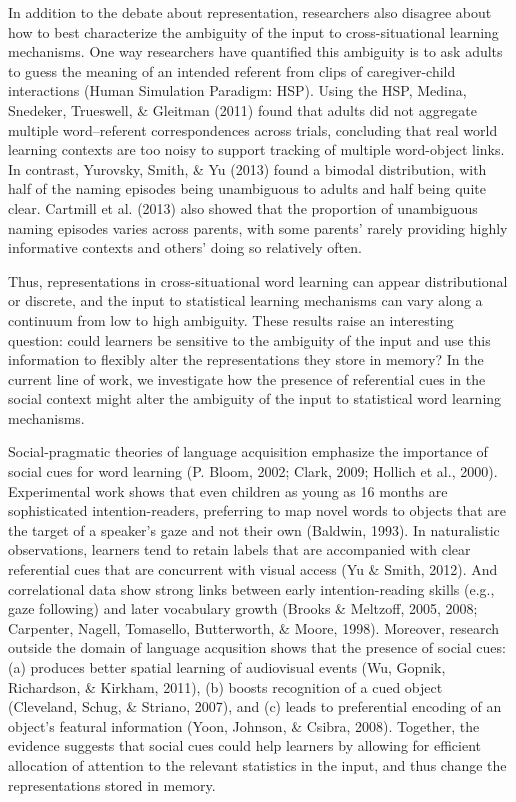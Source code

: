 \documentclass[authoryear, review]{elsarticle}
\begin{document}
In addition to the debate about representation, researchers also
disagree about how to best characterize the ambiguity of the input to
cross-situational learning mechanisms. One way researchers have
quantified this ambiguity is to ask adults to guess the meaning of an
intended referent from clips of caregiver-child interactions (Human
Simulation Paradigm: HSP). Using the HSP, Medina, Snedeker, Trueswell,
\& Gleitman (2011) found that adults did not aggregate multiple
word--referent correspondences across trials, concluding that real world
learning contexts are too noisy to support tracking of multiple
word-object links. In contrast, Yurovsky, Smith, \& Yu (2013) found a
bimodal distribution, with half of the naming episodes being unambiguous
to adults and half being quite clear. Cartmill et al. (2013) also showed
that the proportion of unambiguous naming episodes varies across
parents, with some parents' rarely providing highly informative contexts
and others' doing so relatively often.

Thus, representations in cross-situational word learning can appear
distributional or discrete, and the input to statistical learning
mechanisms can vary along a continuum from low to high ambiguity. These
results raise an interesting question: could learners be sensitive to
the ambiguity of the input and use this information to flexibly alter
the representations they store in memory? In the current line of work,
we investigate how the presence of referential cues in the social
context might alter the ambiguity of the input to statistical word
learning mechanisms.

Social-pragmatic theories of language acquisition emphasize the
importance of social cues for word learning (P. Bloom, 2002; Clark,
2009; Hollich et al., 2000). Experimental work shows that even children
as young as 16 months are sophisticated intention-readers, preferring to
map novel words to objects that are the target of a speaker's gaze and
not their own (Baldwin, 1993). In naturalistic observations, learners
tend to retain labels that are accompanied with clear referential cues
that are concurrent with visual access (Yu \& Smith, 2012). And
correlational data show strong links between early intention-reading
skills (e.g., gaze following) and later vocabulary growth (Brooks \&
Meltzoff, 2005, 2008; Carpenter, Nagell, Tomasello, Butterworth, \&
Moore, 1998). Moreover, research outside the domain of language
acqusition shows that the presence of social cues: (a) produces better
spatial learning of audiovisual events (Wu, Gopnik, Richardson, \&
Kirkham, 2011), (b) boosts recognition of a cued object (Cleveland,
Schug, \& Striano, 2007), and (c) leads to preferential encoding of an
object's featural information (Yoon, Johnson, \& Csibra, 2008).
Together, the evidence suggests that social cues could help learners by
allowing for efficient allocation of attention to the relevant
statistics in the input, and thus change the representations stored in
memory.
\end{document}
